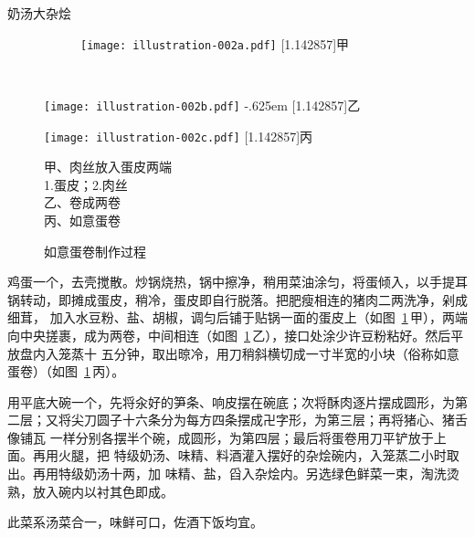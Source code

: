 \begin{recipe}{奶汤大杂烩}
\begin{figure}[h]
%
%
\vspace{-.6875\baselineskip}%
\begin{subfigure}[h]{\linewidth}%
\centering%
\texttt{[image: illustration-002a.pdf]}%
\baselineskip%
\hbox{\fsfamily\scalebox{1}[1.142857]{甲}}%
\end{subfigure}%
\vspace{.3125\baselineskip}%
\\%
\parbox{14.75em}{%
	\hspace{4em}\texttt{[image: illustration-002b.pdf]}%
	\kern-.625em\baselineskip%
	\hbox{\fsfamily\scalebox{1}[1.142857]{乙}}%
}%
\begin{minipage}{11em}
	\vspace{.25\baselineskip}%
	\texttt{[image: illustration-002c.pdf]}%
	\baselineskip%
	\hbox{\fsfamily\scalebox{1}[1.142857]{丙}}%
	\vspace{1.25\baselineskip}%
	\caption{如意蛋卷制作过程}
	\label{fig:fortune-egg-rolls}
	\vspace{1\baselineskip}%
	\begingroup%
	\small%
	\noindent%
	\null\hspace{1.5em}甲、肉丝放入蛋皮两端\\
	\null\hspace{3.5em}1.蛋皮；\hspace{1em}2.肉丝\\
	\null\hspace{1.5em}乙、卷成两卷\\
	\null\hspace{1.5em}丙、如意蛋卷
	\endgroup
\end{minipage}
\vspace{-.75\baselineskip}%
\end{figure}%

\step 鸡蛋一个，去壳搅散。炒锅烧热，锅中擦净，稍用菜油涂匀，将蛋倾入，以手提耳
锅转动，即摊成蛋皮，稍冷，蛋皮即自行脱落。把肥瘦相连的猪肉二两洗净，剁成细茸，
加入水豆粉、盐、胡椒，调匀后铺于贴锅一面的蛋皮上（如图\,%
\ref{fig:fortune-egg-rolls}\,甲），两端向中央搓裹，成为两卷，中间相连（如图\,%
\ref{fig:fortune-egg-rolls}\,乙），接口处涂少许豆粉粘好。然后平放盘内入笼蒸十
五分钟，取出晾冷，用刀稍斜横切成一寸半宽的小块（俗称如意蛋卷）（如图\,%
\ref{fig:fortune-egg-rolls}\,丙）。

\step 用平底大碗一个，先将汆好的笋条、响皮摆在碗底；次将酥肉逐片摆成圆形，为第
二层；又将尖刀圆子十六条分为每方四条摆成卍字形，为第三层；再将猪心、猪舌像铺瓦
一样分别各摆半个碗，成圆形，为第四层；最后将蛋卷用刀平铲放于上面。再用火腿，把
特级奶汤、味精、料酒灌入摆好的杂烩碗内，入笼蒸二小时取出。再用特级奶汤十两，加
味精、盐，舀入杂烩内。另选绿色鲜菜一束，淘洗烫熟，放入碗内以衬其色即成。

\features

此菜系汤菜合一，味鲜可口，佐酒下饭均宜。

\end{recipe}

